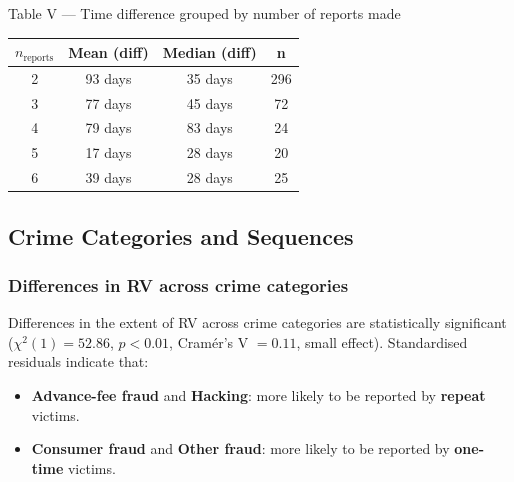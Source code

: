 \documentclass[11pt,a4paper,openany]{report}
\theoremstyle{definition}
\theoremstyle{plain}
\theoremstyle{remark}
\begin{document}
\begin{datapanel}{Table V --- Time difference grouped by number of reports made}
\begin{center}
\begin{tabular}{cccc}
\toprule
$n_\text{reports}$ & \textbf{Mean (diff)} & \textbf{Median (diff)} & \textbf{n} \\
\midrule
2 & 93 days & 35 days & 296 \\
3 & 77 days & 45 days & 72 \\
4 & 79 days & 83 days & 24 \\
5 & 17 days & 28 days & 20 \\
6 & 39 days & 28 days & 25 \\
\bottomrule
\end{tabular}
\end{center}
\end{datapanel}

\subsection{Crime Categories and Sequences}

\subsubsection*{Differences in RV across crime categories}

Differences in the extent of RV across crime categories are statistically significant ($\chi^2(1) = 52.86$, $p < 0.01$, Cramér's V $= 0.11$, small effect). Standardised residuals indicate that:

\begin{itemize}
    \item \textbf{Advance-fee fraud} and \textbf{Hacking}: more likely to be reported by \textbf{repeat} victims.
    \item \textbf{Consumer fraud} and \textbf{Other fraud}: more likely to be reported by \textbf{one-time} victims.
\end{itemize}
\end{document}
